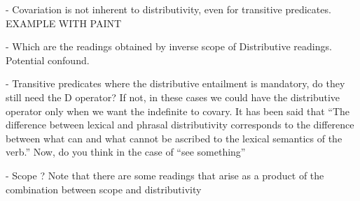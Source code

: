 \documentclass[a4paper]{article}
\begin{document}
- Covariation is not inherent to distributivity, even for transitive predicates. 
EXAMPLE WITH PAINT

- Which are the readings obtained by inverse scope of Distributive readings. Potential confound. 

- Transitive predicates where the distributive entailment is mandatory, do they still need the D operator? If not, in these cases we could have the distributive operator only when we want the indefinite to covary. It has been said that ``The difference between lexical and phrasal distributivity corresponds to the difference between what can and what cannot be ascribed to the lexical semantics of the verb.'' Now, do you think in the case of ``see something'' 

- Scope ? Note that there are some readings that arise as a product of the combination between scope and distributivity
\end{document}
